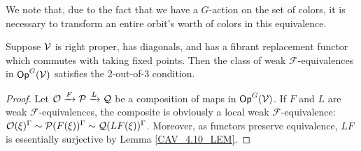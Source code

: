 \documentclass[a4paper,10pt
,draft
]{article}%
\renewcommand{\F}{\mathcal F}
\newcommand{\J}{\mathbb J}
\newcommand{\Q}{\mathcal Q}
\renewcommand{\1}{\ensuremath{\mathbb{id}}}
\begin{document}
\begin{remark}
      We note that, due to the fact that we have a $G$-action on the set of colors,
      it is necessary to transform an entire orbit's worth of colors in this equivalence.
\end{remark}

 
\begin{proposition}
      \label{CAV_4.15_PROP}
      Suppose $\mathcal V$ is right proper, has diagonals, and has a fibrant replacement functor which commutes with taking fixed points.
      Then the class of weak $\F$-equivalences in $\mathsf{Op}^G(\mathcal V)$ satisfies the 2-out-of-3 condition.
\end{proposition}
\begin{proof}
      Let $\O \xrightarrow{F} \P \xrightarrow{L} \Q$ be a composition of maps in $\mathsf{Op}^G(\mathcal V)$.
      If $F$ and $L$ are weak $\F$-equivalences,
      the composite is obviously a local weak $\F$-equivalence:
      $\O(\ksi)^\Gamma \sim \P(F(\ksi))^\Gamma \sim \Q(LF(\ksi))^\Gamma$.
      Moreover, as functors preserve equivalence, $L F$ is essentially surjective by Lemma \ref{CAV_4.10_LEM}. 
      

\end{proof}
\end{document}
